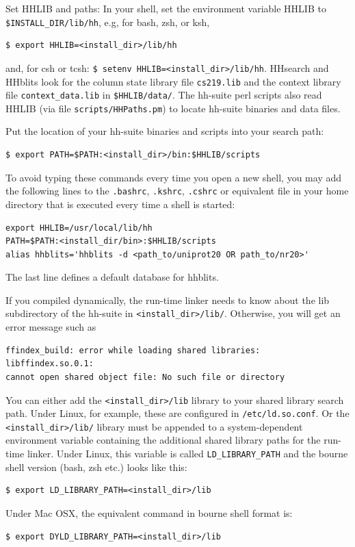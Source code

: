 \documentclass[11pt,a4paper]{article}
\begin{document}
\begin{enum}
\item Set HHLIB and paths: In your shell, set the environment variable HHLIB to \verb`$INSTALL_DIR/lib/hh`, 
e.g, for bash, zsh, or ksh,
\begin{verbatim}
$ export HHLIB=<install_dir>/lib/hh
\end{verbatim}
and, for csh or tcsh: \verb`$ setenv HHLIB=<install_dir>/lib/hh`. 
HHsearch and HHblits look for the column state library file \verb`cs219.lib`
and the context library file \verb`context_data.lib` in \verb`$HHLIB/data/`. The hh-suite
perl scripts also read HHLIB (via file \verb`scripts/HHPaths.pm`) to locate hh-suite binaries and data files.

Put the location of your hh-suite binaries and scripts into your search path:
\begin{verbatim}
$ export PATH=$PATH:<install_dir>/bin:$HHLIB/scripts
\end{verbatim}

To avoid typing these commands every time you open a new shell, you may add the following lines to the \verb`.bashrc`, \verb`.kshrc`, \verb`.cshrc` or equivalent file in your home directory that is executed every time a shell is started:
\begin{verbatim}
export HHLIB=/usr/local/lib/hh
PATH=$PATH:<install_dir/bin>:$HHLIB/scripts
alias hhblits='hhblits -d <path_to/uniprot20 OR path_to/nr20>'
\end{verbatim}
The last line defines a default database for hhblits. 
\vspace{2mm}


\item If you compiled dynamically, the run-time linker needs to know about the lib subdirectory 
of the hh-suite in \verb`<install_dir>/lib/`. Otherwise, you will get an error message such as
\begin{verbatim}
ffindex_build: error while loading shared libraries: libffindex.so.0.1: 
cannot open shared object file: No such file or directory
\end{verbatim}
You can either add the \verb`<install_dir>/lib` library to your shared library search path. 
Under Linux, for example, these are configured in \verb`/etc/ld.so.conf`. 
Or the \verb`<install_dir>/lib/` library must be appended to a system-dependent environment variable 
containing the additional shared library paths for the run-time linker.
Under Linux, this variable is called \verb`LD_LIBRARY_PATH` and the bourne shell version (bash, zsh etc.) looks like this:
\begin{verbatim}
$ export LD_LIBRARY_PATH=<install_dir>/lib
\end{verbatim}
Under Mac OSX, the equivalent command in bourne shell format is:
\begin{verbatim}
$ export DYLD_LIBRARY_PATH=<install_dir>/lib
\end{verbatim}
\vspace{2mm}


\end{enum}
\end{document}
